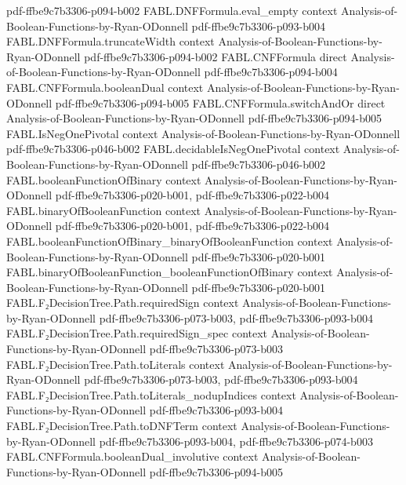 \begin{theorem}
  {pdf-ffbe9c7b3306-p094-b002}
\proofstep
  {FABL.DNFFormula.eval_empty}
  {context}
  {Analysis-of-Boolean-Functions-by-Ryan-ODonnell}
  {pdf-ffbe9c7b3306-p093-b004}
\proofstep
  {FABL.DNFFormula.truncateWidth}
  {context}
  {Analysis-of-Boolean-Functions-by-Ryan-ODonnell}
  {pdf-ffbe9c7b3306-p094-b002}
\proofstep
  {FABL.CNFFormula}
  {direct}
  {Analysis-of-Boolean-Functions-by-Ryan-ODonnell}
  {pdf-ffbe9c7b3306-p094-b004}
\proofstep
  {FABL.CNFFormula.booleanDual}
  {context}
  {Analysis-of-Boolean-Functions-by-Ryan-ODonnell}
  {pdf-ffbe9c7b3306-p094-b005}
\proofstep
  {FABL.CNFFormula.switchAndOr}
  {direct}
  {Analysis-of-Boolean-Functions-by-Ryan-ODonnell}
  {pdf-ffbe9c7b3306-p094-b005}
\proofstep
  {FABL.IsNegOnePivotal}
  {context}
  {Analysis-of-Boolean-Functions-by-Ryan-ODonnell}
  {pdf-ffbe9c7b3306-p046-b002}
\proofstep
  {FABL.decidableIsNegOnePivotal}
  {context}
  {Analysis-of-Boolean-Functions-by-Ryan-ODonnell}
  {pdf-ffbe9c7b3306-p046-b002}
\proofstep
  {FABL.booleanFunctionOfBinary}
  {context}
  {Analysis-of-Boolean-Functions-by-Ryan-ODonnell}
  {pdf-ffbe9c7b3306-p020-b001,
    pdf-ffbe9c7b3306-p022-b004}
\proofstep
  {FABL.binaryOfBooleanFunction}
  {context}
  {Analysis-of-Boolean-Functions-by-Ryan-ODonnell}
  {pdf-ffbe9c7b3306-p020-b001,
    pdf-ffbe9c7b3306-p022-b004}
\proofstep
  {FABL.booleanFunctionOfBinary_binaryOfBooleanFunction}
  {context}
  {Analysis-of-Boolean-Functions-by-Ryan-ODonnell}
  {pdf-ffbe9c7b3306-p020-b001}
\proofstep
  {FABL.binaryOfBooleanFunction_booleanFunctionOfBinary}
  {context}
  {Analysis-of-Boolean-Functions-by-Ryan-ODonnell}
  {pdf-ffbe9c7b3306-p020-b001}
\proofstep
  {FABL.F₂DecisionTree.Path.requiredSign}
  {context}
  {Analysis-of-Boolean-Functions-by-Ryan-ODonnell}
  {pdf-ffbe9c7b3306-p073-b003,
    pdf-ffbe9c7b3306-p093-b004}
\proofstep
  {FABL.F₂DecisionTree.Path.requiredSign_spec}
  {context}
  {Analysis-of-Boolean-Functions-by-Ryan-ODonnell}
  {pdf-ffbe9c7b3306-p073-b003}
\proofstep
  {FABL.F₂DecisionTree.Path.toLiterals}
  {context}
  {Analysis-of-Boolean-Functions-by-Ryan-ODonnell}
  {pdf-ffbe9c7b3306-p073-b003,
    pdf-ffbe9c7b3306-p093-b004}
\proofstep
  {FABL.F₂DecisionTree.Path.toLiterals_nodupIndices}
  {context}
  {Analysis-of-Boolean-Functions-by-Ryan-ODonnell}
  {pdf-ffbe9c7b3306-p093-b004}
\proofstep
  {FABL.F₂DecisionTree.Path.toDNFTerm}
  {context}
  {Analysis-of-Boolean-Functions-by-Ryan-ODonnell}
  {pdf-ffbe9c7b3306-p093-b004,
    pdf-ffbe9c7b3306-p074-b003}
\proofstep
  {FABL.CNFFormula.booleanDual_involutive}
  {context}
  {Analysis-of-Boolean-Functions-by-Ryan-ODonnell}
  {pdf-ffbe9c7b3306-p094-b005}

\end{theorem}
